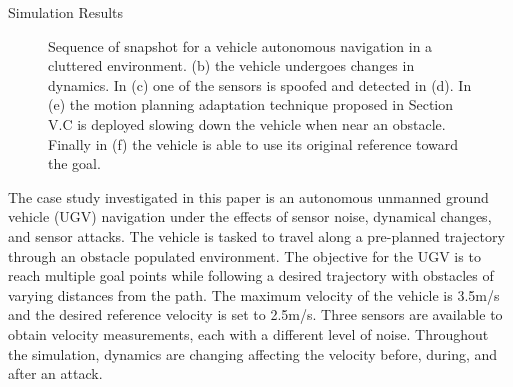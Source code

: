 \begin{section}{Simulation Results}
\begin{figure}[t]
\vspace{-8pt}
\caption{ Sequence of snapshot for a vehicle autonomous navigation in a cluttered environment. (b) the vehicle undergoes changes in dynamics. In (c) one of the sensors is spoofed and detected in (d). In (e) the motion planning adaptation technique proposed in Section V.C is deployed slowing down the vehicle when near an obstacle. Finally in (f) the vehicle is able to use its original reference toward the goal.} 
\vspace{-8pt}
\label{fig:simulation}
\end{figure}

The case study investigated in this paper is an autonomous unmanned ground vehicle (UGV) navigation under the effects of sensor noise, dynamical changes, and sensor attacks. The vehicle is tasked to travel along a pre-planned trajectory through an obstacle populated environment. 
The objective for the UGV is to reach multiple goal points while following a desired trajectory with obstacles of varying distances from the path. The maximum velocity of the vehicle is 3.5m/s and the desired reference velocity is set to 2.5m/s. Three sensors are available to obtain velocity measurements, each with a different level of noise. Throughout the simulation, dynamics are changing affecting the velocity before, during, and after an attack. 


\end{section}

